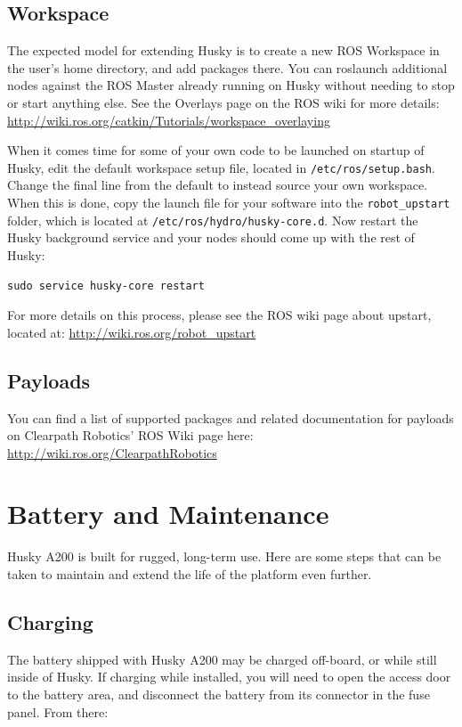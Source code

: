 \documentclass[]{clearpath-latex/clearpath-manual}
\begin{document}
\subsection{Workspace}
The expected model for extending Husky is to create a new ROS Workspace in the user’s home directory, 
and add packages there. You can roslaunch additional nodes against the ROS Master already running on Husky 
without needing to stop or start anything else. See the Overlays page on the ROS wiki for more details: 
\url{http://wiki.ros.org/catkin/Tutorials/workspace_overlaying}
 
When it comes time for some of your own code to be launched on startup of Husky, edit the default workspace setup file, 
located in \lstinline{/etc/ros/setup.bash}. Change the final line from the default to instead source your own workspace. 
When this is done, copy the launch file for your software into the \lstinline{robot_upstart} folder, which is located at 
\lstinline{/etc/ros/hydro/husky-core.d}. Now restart the Husky background service and your nodes should come 
up with the rest of Husky:

\begin{lstlisting}
sudo service husky-core restart
\end{lstlisting}

For more details on this process, please see the ROS wiki page about upstart, located at: \url{http://wiki.ros.org/robot_upstart} 

\subsection{Payloads}
You can find a list of supported packages and related documentation for payloads on Clearpath Robotics’ 
ROS Wiki page here: \url{http://wiki.ros.org/ClearpathRobotics}
\newpage

\section{Battery and Maintenance}
Husky A200 is built for rugged, long-term use. Here are some steps that can be 
taken to maintain and extend the life of the platform even further.

\subsection{Charging}
The battery shipped with Husky A200 may be charged off-board, or while still inside of Husky. 
If charging while installed, you will need to open the access door to the battery area, and 
disconnect the battery from its connector in the fuse panel. From there:
\end{document}
